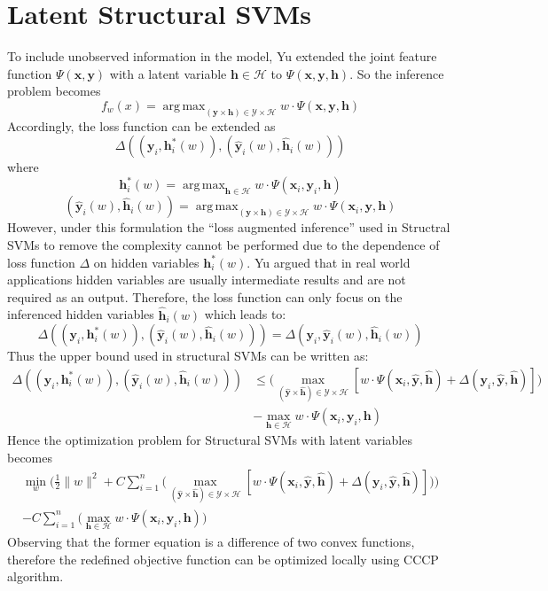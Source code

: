 \documentclass{article}
\DeclareMathOperator*{\argmax}{arg\,max}
\begin{document}
	\section{Latent Structural SVMs}
		To include unobserved information in the model, Yu\cite{yu2009learning} extended the joint feature function\cite{tsochantaridis2005large}  $\Psi(\mathbf{x},\mathbf{y}) $ with a latent variable $\mathbf{h}\in \mathcal{H}$ to $\Psi(\mathbf{x},\mathbf{y},\mathbf{h}) $. So the inference problem becomes
		$$
		f_w(x) = \argmax_{(\mathbf{y} \times \mathbf{h}) \in \mathcal{Y} \times \mathcal{H}} w\cdot\Psi(\mathbf{x},\mathbf{y},\mathbf{h})
		$$
		Accordingly, the loss function can be extended as
		$$
		\Delta((\mathbf{y}_i,\mathbf{h}^*_i(w)),(\mathbf{\hat{y}}_i(w),\mathbf{\hat{h}}_i(w)))
		$$
		where
		$$
		\mathbf{h}^*_i(w) = \argmax_{\mathbf{h} \in \mathcal{H}} w \cdot \Psi(\mathbf{x}_i,\mathbf{y}_i,\mathbf{h})
		$$
		$$
		(\mathbf{\hat{y}}_i(w),\mathbf{\hat{h}}_i(w))=\argmax_{(\mathbf{y} \times \mathbf{h}) \in \mathcal{Y} \times \mathcal{H}} w\cdot\Psi(\mathbf{x}_i,\mathbf{y},\mathbf{h})
		$$
		However, under this formulation the ``loss augmented inference'' used in Structral SVMs\cite{tsochantaridis2005large} to remove the complexity cannot be performed due to the dependence of loss function $\Delta$ on hidden variables $\mathbf{h}^*_i(w)$. Yu argued that in real world applications hidden variables are usually intermediate results and are not required as an output\cite{yu2009learning}. Therefore, the loss function can only focus on the inferenced hidden variables $\mathbf{\hat{h}}_i(w)$ which leads to:
		$$
		\Delta((\mathbf{y}_i,\mathbf{h}^*_i(w)),(\mathbf{\hat{y}}_i(w),\mathbf{\hat{h}}_i(w))) = \Delta(\mathbf{y}_i,\mathbf{\hat{y}}_i(w),\mathbf{\hat{h}}_i(w))
		$$
		Thus the upper bound used in structural SVMs can be written as:
		\begin{align*}
			\Delta((\mathbf{y}_i,\mathbf{h}^*_i(w)),(\mathbf{\hat{y}}_i(w),\mathbf{\hat{h}}_i(w)))
			&\leq \bigg(\max_{(\mathbf{\hat{y}} \times \mathbf{\hat{h}}) \in \mathcal{Y} \times \mathcal{H}} [w\cdot\Psi(\mathbf{x}_i,\mathbf{\hat{y}},\mathbf{\hat{h}}) + \Delta(\mathbf{y}_i,\mathbf{\hat{y}},\mathbf{\hat{h}})]\bigg)\\
			&-\max_{\mathbf{h} \in \mathcal{H}} w \cdot \Psi(\mathbf{x}_i,\mathbf{y}_i,\mathbf{h})
		\end{align*}
		Hence the optimization problem for Structural SVMs with latent variables becomes
		\begin{align*}
			\min_w\bigg(\frac{1}{2}\|w\|^2+
			C\sum_{i=1}^{n}\big(\max_{(\mathbf{\hat{y}} \times \mathbf{\hat{h}}) \in \mathcal{Y} \times \mathcal{H}} [w\cdot\Psi(\mathbf{x}_i,\mathbf{\hat{y}},\mathbf{\hat{h}}) + \Delta(\mathbf{y}_i,\mathbf{\hat{y}},\mathbf{\hat{h}})]\big)\bigg)\\
			-C\sum_{i=1}^{n}\big(\max_{\mathbf{h} \in \mathcal{H}} w \cdot \Psi(\mathbf{x}_i,\mathbf{y}_i,\mathbf{h})\big)
		\end{align*}
		Observing that the former equation is a difference of two convex functions, therefore the redefined objective function can be optimized locally using CCCP algorithm.
		
\end{document}
